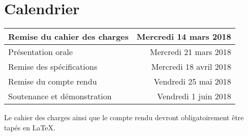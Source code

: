 \documentclass[11pt]{article}
\begin{document}
\section{Calendrier}

\begin{tabular}{|l|r|}
  \hline
  Remise du cahier des charges & Mercredi 14 mars 2018 \\
  \hline
  Présentation orale & Mercredi 21 mars 2018 \\
  \hline
  Remise des spécifications & Mercredi 18 avril 2018 \\
  \hline
  Remise du compte rendu & Vendredi 25 mai 2018 \\
  \hline
  Soutenance et démonstration & Vendredi 1 juin 2018 \\
  \hline
\end{tabular}

\vspace{1\baselineskip}

Le cahier des charges ainsi que le compte rendu devront obligatoirement être
tapés en \LaTeX.
\end{document}
